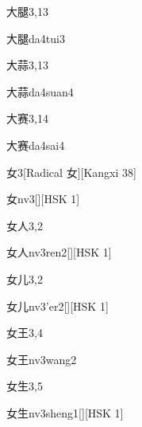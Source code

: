 \begin{entry}{大腿}{3,13}
  \begin{phonetics}{大腿}{da4tui3}
  \end{phonetics}
\end{entry}

\begin{entry}{大蒜}{3,13}
  \begin{phonetics}{大蒜}{da4suan4}
  \end{phonetics}
\end{entry}

\begin{entry}{大赛}{3,14}
  \begin{phonetics}{大赛}{da4sai4}
  \end{phonetics}
\end{entry}

\begin{entry}{女}{3}[Radical 女][Kangxi 38]
  \begin{phonetics}{女}{nv3}[][HSK 1]
  \end{phonetics}
\end{entry}

\begin{entry}{女人}{3,2}
  \begin{phonetics}{女人}{nv3ren2}[][HSK 1]
  \end{phonetics}
\end{entry}

\begin{entry}{女儿}{3,2}
  \begin{phonetics}{女儿}{nv3'er2}[][HSK 1]
  \end{phonetics}
\end{entry}

\begin{entry}{女王}{3,4}
  \begin{phonetics}{女王}{nv3wang2}
  \end{phonetics}
\end{entry}

\begin{entry}{女生}{3,5}
  \begin{phonetics}{女生}{nv3sheng1}[][HSK 1]
  \end{phonetics}
\end{entry}

